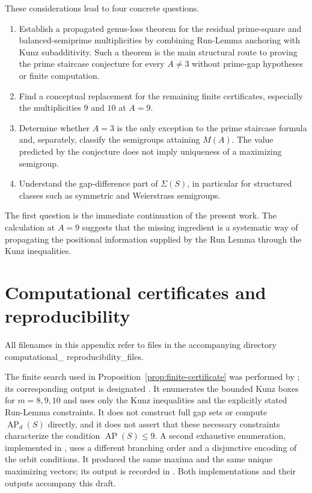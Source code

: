 \documentclass[11pt]{article}
\theoremstyle{plain}
\theoremstyle{definition}
\theoremstyle{remark}
\newcommand{\AP}{\operatorname{AP}}
\newcommand{\compdir}{{\small\ttfamily computational\_\allowbreak
  reproducibility\_\allowbreak files}}
\begin{document}
These considerations lead to four concrete questions.

\begin{enumerate}
    \item Establish a propagated genus-loss theorem for the residual
    prime-square and balanced-semiprime multiplicities by combining
    Run-Lemma anchoring with Kunz subadditivity.  Such a theorem is the main
    structural route to proving the prime staircase conjecture for every
    \(A\neq3\) without prime-gap hypotheses or finite computation.

    \item Find a conceptual replacement for the remaining finite certificates,
    especially the multiplicities \(9\) and \(10\) at \(A=9\).

    \item Determine whether \(A=3\) is the only exception to the prime
    staircase formula and, separately, classify the semigroups attaining
    \(M(A)\).  The value predicted by the conjecture does not imply uniqueness
    of a maximizing semigroup.

    \item Understand the gap-difference part of \(\Sigma(S)\), in particular
    for structured classes such as symmetric and Weierstrass semigroups.
\end{enumerate}

The first question is the immediate continuation of the present work.  The
calculation at \(A=9\) suggests that the missing ingredient is a systematic
way of propagating the positional information supplied by the Run Lemma
through the Kunz inequalities.

\appendix

\section{Computational certificates and reproducibility}
\label{app:computation}

All filenames in this appendix refer to files in the accompanying directory
\compdir{}.

The finite search used in Proposition~\ref{prop:finite-certificate} was
performed by ; its corresponding output is
designated .  It enumerates the bounded Kunz boxes for
$m=8,9,10$ and uses only the Kunz inequalities and the explicitly stated
Run-Lemma constraints.  It does not construct full gap sets or compute
$\AP_d(S)$ directly, and it does not assert that these necessary constraints
characterize the condition $\AP(S)\leq9$.  A second exhaustive enumeration,
implemented in , uses a different
branching order and a disjunctive encoding of the orbit conditions.  It
produced the same maxima and the same unique maximizing vectors; its output is
recorded in .  Both implementations
and their outputs accompany this draft.
\end{document}
